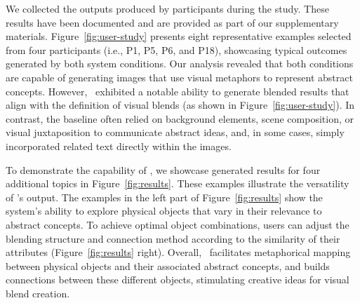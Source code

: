 We collected the outputs produced by participants during the study.
These results have been documented and are provided as part of our supplementary materials.
Figure~\ref{fig:user-study} presents eight representative examples selected from four participants (i.e., P1, P5, P6, and P18), showcasing typical outcomes generated by both system conditions. 
Our analysis revealed that both conditions are capable of generating images that use visual metaphors to represent abstract concepts.
However, \sysname\ exhibited a notable ability to generate blended results that align with the definition of visual blends (as shown in Figure~\ref{fig:user-study}). 
In contrast, the baseline often relied on background elements, scene composition, or visual juxtaposition to communicate abstract ideas, and, in some cases, simply incorporated related text directly within the images.









To demonstrate the capability of \sysname, we showcase generated results for four additional topics in Figure~\ref{fig:results}.  
These examples illustrate the versatility of \sysname's output.
The examples in the left part of Figure~\ref{fig:results} show the system's ability to explore physical objects that vary in their relevance to abstract concepts.
To achieve optimal object combinations, users can adjust the blending structure and connection method according to the similarity of their attributes (Figure~\ref{fig:results} right).
Overall, \sysname\ facilitates metaphorical mapping between physical objects and their associated abstract concepts, and builds connections between these different objects, stimulating creative ideas for visual blend creation.  

